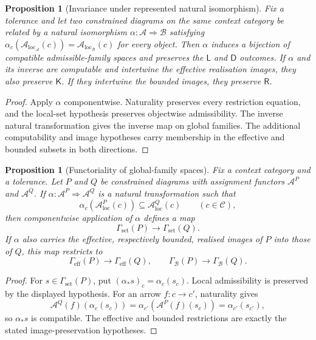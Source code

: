 \documentclass[11pt]{article}
\theoremstyle{plain}
\newtheorem{proposition}[theorem]{Proposition}
\theoremstyle{definition}
\theoremstyle{remark}
\newcommand{\LocalAdm}{\mathcal{A}_{\mathrm{loc}}}
\begin{document}
\begin{proposition}[Invariance under represented natural isomorphism]
\label{prop:presentation-invariance}
Fix a tolerance and let two constrained diagrams on the same context category
be related by a natural isomorphism $\alpha:\mathcal A\Rightarrow\mathcal B$ satisfying
$\alpha_c(\LocalAdm_{\mathcal A}(c))=
\LocalAdm_{\mathcal B}(c)$ for every object. Then $\alpha$ induces a bijection
of compatible admissible-family spaces and preserves the $\mathsf L$ and
$\mathsf D$ outcomes. If $\alpha$ and its inverse are computable and intertwine
the effective realisation images, they also preserve $\mathsf K$. If they
intertwine the bounded images, they preserve $\mathsf R$.
\end{proposition}

\begin{proof}
Apply $\alpha$ componentwise. Naturality preserves every restriction equation,
and the local-set hypothesis preserves objectwise admissibility. The inverse
natural transformation gives the inverse map on global families. The additional
computability and image hypotheses carry membership in the effective and bounded
subsets in both directions.
\end{proof}

\begin{proposition}[Functoriality of global-family spaces]
\label{prop:global-family-functoriality}
Fix a context category and a tolerance. Let $P$ and $Q$ be constrained diagrams
with assignment functors $\mathcal A^P$ and $\mathcal A^Q$. If
$\alpha:\mathcal A^P\Rightarrow\mathcal A^Q$ is a natural transformation such
that
\[
\alpha_c(\LocalAdm^P(c))\subseteq\LocalAdm^Q(c)
\qquad(c\in\mathcal C),
\]
then componentwise application of $\alpha$ defines a map
\[
\Gamma_{\mathrm{set}}(P)\longrightarrow\Gamma_{\mathrm{set}}(Q).
\]
If $\alpha$ also carries the effective, respectively bounded, realised images
of $P$ into those of $Q$, this map restricts to
\[
\Gamma_{\mathrm{eff}}(P)\to\Gamma_{\mathrm{eff}}(Q),
\qquad
\Gamma_{\mathcal B}(P)\to\Gamma_{\mathcal B}(Q).
\]
\end{proposition}

\begin{proof}
For $s\in\Gamma_{\mathrm{set}}(P)$, put
$(\alpha_*s)_c=\alpha_c(s_c)$. Local admissibility is preserved by the displayed
hypothesis. For an arrow $f:c\to c'$, naturality gives
\[
\mathcal A^Q(f)(\alpha_c(s_c))
=\alpha_{c'}(\mathcal A^P(f)(s_c))
=\alpha_{c'}(s_{c'}),
\]
so $\alpha_*s$ is compatible. The effective and bounded restrictions are exactly
the stated image-preservation hypotheses.
\end{proof}
\end{document}
